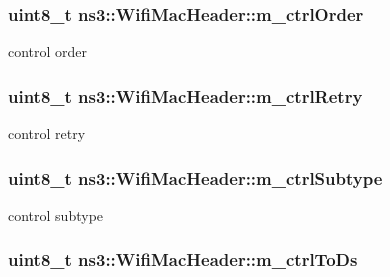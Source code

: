 \subsubsection[{\texorpdfstring{m\+\_\+ctrl\+Order}{m_ctrlOrder}}]{\setlength{\rightskip}{0pt plus 5cm}uint8\+\_\+t ns3\+::\+Wifi\+Mac\+Header\+::m\+\_\+ctrl\+Order\hspace{0.3cm}{\ttfamily [private]}}\hypertarget{classns3_1_1WifiMacHeader_a7363484f6b8f30e7ec2463150fdbed8f}{}\label{classns3_1_1WifiMacHeader_a7363484f6b8f30e7ec2463150fdbed8f}


control order 

\subsubsection[{\texorpdfstring{m\+\_\+ctrl\+Retry}{m_ctrlRetry}}]{\setlength{\rightskip}{0pt plus 5cm}uint8\+\_\+t ns3\+::\+Wifi\+Mac\+Header\+::m\+\_\+ctrl\+Retry\hspace{0.3cm}{\ttfamily [private]}}\hypertarget{classns3_1_1WifiMacHeader_a0667d92e1b78c852cc55fe1f4342d6c9}{}\label{classns3_1_1WifiMacHeader_a0667d92e1b78c852cc55fe1f4342d6c9}


control retry 

\subsubsection[{\texorpdfstring{m\+\_\+ctrl\+Subtype}{m_ctrlSubtype}}]{\setlength{\rightskip}{0pt plus 5cm}uint8\+\_\+t ns3\+::\+Wifi\+Mac\+Header\+::m\+\_\+ctrl\+Subtype\hspace{0.3cm}{\ttfamily [private]}}\hypertarget{classns3_1_1WifiMacHeader_a512ea2949efb1e5f69b8ea9165441f7d}{}\label{classns3_1_1WifiMacHeader_a512ea2949efb1e5f69b8ea9165441f7d}


control subtype 

\subsubsection[{\texorpdfstring{m\+\_\+ctrl\+To\+Ds}{m_ctrlToDs}}]{\setlength{\rightskip}{0pt plus 5cm}uint8\+\_\+t ns3\+::\+Wifi\+Mac\+Header\+::m\+\_\+ctrl\+To\+Ds\hspace{0.3cm}{\ttfamily [private]}}\hypertarget{classns3_1_1WifiMacHeader_af67f68e704e3f42e72febc23df5aceb9}{}\label{classns3_1_1WifiMacHeader_af67f68e704e3f42e72febc23df5aceb9}


